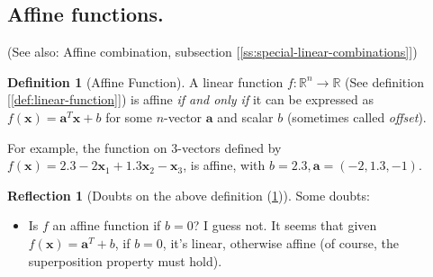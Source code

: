 \documentclass[11pt]{book}
\theoremstyle{definition}
\newtheorem{definition}{Definition}
\theoremstyle{plain}
\theoremstyle{problemstyle}
\theoremstyle{remark}
\theoremstyle{definition}
\newtheorem{reflection}{Reflection}
\begin{document}
\subsection*{Affine functions.}
(See also: Affine combination, subsection [\ref{ss:special-linear-combinations}])
\begin{definition}[Affine Function]
    \label{def:affine-function}
    A linear function $f:\mathbb{R}^n\rightarrow\mathbb{R}$ (See definition [\ref{def:linear-function}]) is affine \emph{if and only if} it can be expressed as $f(\boldsymbol{x})=\boldsymbol{a}^T\boldsymbol{x}+b$ for some $n$-vector $\boldsymbol{a}$ and scalar $b$ (sometimes called \emph{offset}).
\end{definition}

For example, the function on $3$-vectors defined by $f(\boldsymbol{x})=2.3−2\boldsymbol{x}_1+1.3\boldsymbol{x}_2−\boldsymbol{x}_3$, is affine, with $b=2.3,\boldsymbol{a}=(−2, 1.3, −1)$.

\begin{reflection}[Doubts on the above definition (\ref{def:affine-function})]
    Some doubts:
    \begin{itemize}
        \item Is $f$ an affine function if $b=0$? I guess not. It seems that given $f(\boldsymbol{x})=\boldsymbol{a}^T+b$, if $b=0$, it's linear, otherwise affine (of course, the superposition property must hold).
    \end{itemize}
\end{reflection}
\end{document}
